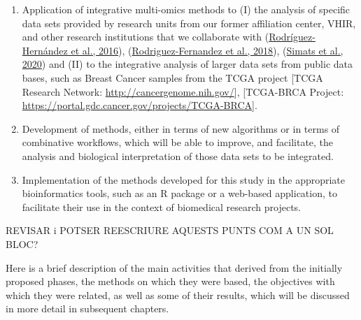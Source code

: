\documentclass[a4paper, nobind]{templates/ociamthesis}
\begin{document}
\begin{enumerate}
\def\labelenumi{\arabic{enumi}.}
\item
  Application of integrative multi-omics methods to (I) the analysis of specific data sets provided by research units from our former affiliation center, VHIR, and other research institutions that we collaborate with (\protect\hyperlink{ref-rodriguez-hernandez_cinacalcet_2016}{Rodríguez-Hernández et al., 2016}), (\protect\hyperlink{ref-rodriguez-fernandez_phosphatidyl_2018}{Rodriguez-Fernandez et al., 2018}), (\protect\hyperlink{ref-simats_mouse_2020}{Simats et al., 2020}) and (II) to the integrative analysis of larger data sets from public data bases, such as Breast Cancer samples from the TCGA project {[}TCGA Research Network: \url{http://cancergenome.nih.gov/}{]}, {[}TCGA-BRCA Project: \url{https://portal.gdc.cancer.gov/projects/TCGA-BRCA}{]}.
\item
  Development of methods, either in terms of new algorithms or in terms of combinative workflows, which will be able to improve, and facilitate, the analysis and biological interpretation of those data sets to be integrated.
\item
  Implementation of the methods developed for this study in the appropriate bioinformatics tools, such as an R package or a web-based application, to facilitate their use in the context of biomedical research projects.
\end{enumerate}

REVISAR i POTSER REESCRIURE AQUESTS PUNTS COM A UN SOL BLOC?

Here is a brief description of the main activities that derived from the initially proposed phases, the methods on which they were based, the objectives with which they were related, as well as some of their results, which will be discussed in more detail in subsequent chapters.
\end{document}

